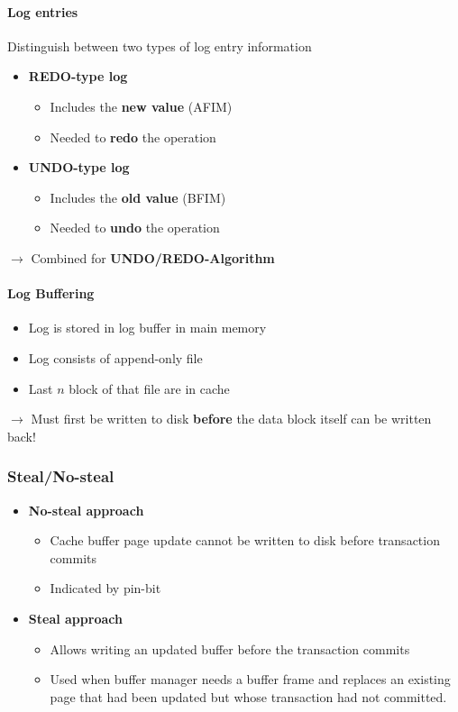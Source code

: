 \paragraph{Log entries}Distinguish between two types of log entry information
\begin{itemize}
	\item \textbf{REDO-type log}
	\begin{itemize}
		\item Includes the \textbf{new value} (AFIM)
		\item Needed to \textbf{redo} the operation
	\end{itemize}
	\item \textbf{UNDO-type log}
	\begin{itemize}
		\item Includes the \textbf{old value} (BFIM)
		\item Needed to \textbf{undo} the operation
	\end{itemize}	
\end{itemize}
$\rightarrow$ Combined for \textbf{UNDO/REDO-Algorithm}
\paragraph{Log Buffering}
\begin{itemize}
	\item Log is stored in log buffer in main memory
	\item Log consists of append-only file
	\item Last $n$ block of that file are in cache
\end{itemize}
$\rightarrow$ Must first be written to disk \textbf{before} the data block itself can be written back!
\subsubsection{Steal/No-steal}
\begin{itemize}
	\item \textbf{No-steal approach}
	\begin{itemize}
		\item Cache buffer page update cannot be written to disk before transaction commits
		\item Indicated by pin-bit
	\end{itemize}
	\item \textbf{Steal approach}
	\begin{itemize}
		\item Allows writing an updated buffer before the transaction commits
		\item Used when buffer manager needs a buffer frame and replaces an existing page that had been updated but whose transaction had not committed.
	\end{itemize}
\end{itemize}
